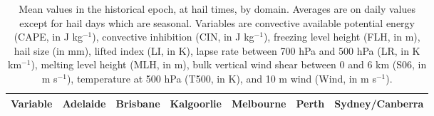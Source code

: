 \documentclass[draft,grl]{agutexSI2019}\usepackage[]{graphicx}\usepackage[]{xcolor}
\begin{document}
\begin{article}
\begin{table} 
    \centering
    \caption{Mean values in the historical epoch, at hail times, by domain.
    Averages are on daily values except for hail days which are seasonal.
    Variables are convective available potential energy (CAPE, in J kg$^{-1}$),
    convective inhibition (CIN, in J kg$^{-1}$), freezing level height (FLH, in
    m), hail size (in mm), lifted index (LI, in K), lapse rate between 700 hPa
    and 500 hPa (LR, in K km$^{-1}$), melting level height (MLH, in m), bulk
    vertical wind shear between 0 and 6 km (S06, in m s$^{-1}$), temperature at
    500 hPa (T500, in K), and 10 m wind (Wind, in m s$^{-1}$).}
    \label{tab:hist_means}
    \begin{tabular}{lcccccc}
        \hline
        Variable  & Adelaide & Brisbane & Kalgoorlie & Melbourne & Perth & \multicolumn{1}{c}{Sydney/Canberra} \\ 
        \hline        

\end{tabular}
\end{table}
\end{article}
\end{document}
